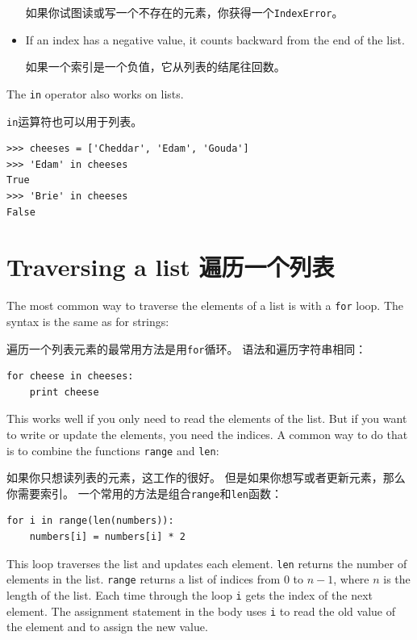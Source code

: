 \documentclass[10pt]{book}
\begin{document}
\begin{CJK}{UTF8}{gbsn}
\begin{itemize}
如果你试图读或写一个不存在的元素，你获得一个{\tt IndexError}。

\item If an index has a negative value, it counts backward from the
end of the list.

如果一个索引是一个负值，它从列表的结尾往回数。

\end{itemize}


The {\tt in} operator also works on lists.

{\tt in}运算符也可以用于列表。

\begin{verbatim}
>>> cheeses = ['Cheddar', 'Edam', 'Gouda']
>>> 'Edam' in cheeses
True
>>> 'Brie' in cheeses
False
\end{verbatim}


\section{Traversing a list 遍历一个列表}

The most common way to traverse the elements of a list is
with a {\tt for} loop.  The syntax is the same as for strings:

遍历一个列表元素的最常用方法是用{\tt for}循环。
语法和遍历字符串相同：

\begin{verbatim}
for cheese in cheeses:
    print cheese
\end{verbatim}
%
This works well if you only need to read the elements of the
list.  But if you want to write or update the elements, you
need the indices.  A common way to do that is to combine
the functions {\tt range} and {\tt len}:

如果你只想读列表的元素，这工作的很好。
但是如果你想写或者更新元素，那么你需要索引。
一个常用的方法是组合{\tt range}和{\tt len}函数：

\begin{verbatim}
for i in range(len(numbers)):
    numbers[i] = numbers[i] * 2
\end{verbatim}
%
This loop traverses the list and updates each element.  {\tt len}
returns the number of elements in the list.  {\tt range} returns
a list of indices from 0 to $n-1$, where $n$ is the length of
the list.  Each time through the loop {\tt i} gets the index
of the next element.  The assignment statement in the body uses
{\tt i} to read the old value of the element and to assign the
new value.


\end{CJK}
\end{document}
